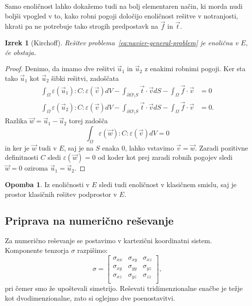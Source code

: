 \documentclass[12pt,a4paper,twoside]{article}
\theoremstyle{definition} %
\newtheorem{opomba}[definicija]{Opomba}
\theoremstyle{plain} %
\newtheorem{izrek}[definicija]{Izrek}
\numberwithin{equation}{section}
\newcommand{\eps}{\varepsilon}
\newcommand{\vv}{\vec{v}}
\newcommand{\vt}{\vec{t}}
\newcommand{\vu}{\vec{u}}
\newcommand{\vw}{\vec{w}}
\newcommand{\vf}{\vec{f}}
\newcommand{\ts}{\sigma}
\begin{document}
Samo enoličnost lahko dokažemo tudi na bolj elementaren način, ki morda nudi boljši
vpogled v to, kako robni pogoji določijo enoličnost rešitve v notranjosti, hkrati pa ne potrebuje
tako strogih predpostavk na $\vf$ in $\vt$.
\begin{izrek}[Kirchoff]
  Rešitev problema~\ref{eq:navier-general-problem} je enolična v
  $E$, če obstaja.
\end{izrek}
\begin{proof}
Denimo, da imamo dve rešitvi $\vu_1$ in $\vu_2$ z enakimi robnimi pogoji.
Ker sta tako $\vu_1$ kot $\vu_2$ šibki rešitvi, zadoščata
\begin{align*}
\int_{\Omega}\eps(\vu_1) : C : \eps(\vv) dV - \int_{\partial \Omega\setminus S} \vt\cdot \vv dS -
\int_{\Omega} \vf\cdot \vv &= 0 \\
\int_{\Omega}\eps(\vu_2) : C : \eps(\vv) dV - \int_{\partial \Omega\setminus S} \vt\cdot \vv dS -
\int_{\Omega} \vf\cdot \vv &= 0.
\end{align*}
Razlika $\vw = \vu_1 - \vu_2$ torej zadošča
\begin{equation*}
   \int_{\Omega}\eps(\vw) : C : \eps(\vv) dV = 0
\end{equation*}
in ker je $\vw$ tudi v $E$, saj je na $S$ enaka 0, lahko vstavimo $\vv = \vw$. Zaradi pozitivne
definitnosti $C$ sledi $\eps(\vw) = 0$ od koder kot prej zaradi robnih pogojev sledi $\vw = 0$
oziroma $\vu_1 = \vu_2$.
\end{proof}
\begin{opomba}
  Iz enoličnosti v $E$ sledi tudi enoličnost v klasičnem smislu, saj je prostor klasičnih rešitev
  podprostor v $E$.
\end{opomba}

\subsection{Priprava na numerično reševanje}
Za numerično reševanje se postavimo v kartezični koordinatni sistem.
Komponente tenzorja $\ts$ razpišimo:
\begin{equation}
  \ts =
  \begin{bmatrix}
    \ts_{xx} & \ts_{xy} & \ts_{xz} \\
    \ts_{xy} & \ts_{yy} & \ts_{yz} \\
    \ts_{xz} & \ts_{yz} & \ts_{zz} \\
  \end{bmatrix},
\end{equation}
pri čemer smo že upoštevali simetrijo. Reševati tridimenzionalne enačbe je težje
kot dvodimenzionalne, zato si oglejmo dve poenostavitvi.
\end{document}
